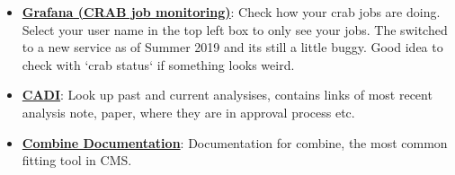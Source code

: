 \begin{itemize}
  \item \textbf{\href{https://monit-grafana.cern.ch/d/cmsTMGlobal/cms-tasks-monitoring-globalview?orgId=11}{Grafana (CRAB job monitoring)}}:
    Check how your crab jobs are doing. Select your user name in the top left box to only see your jobs. The switched to a new service as of Summer 2019 and its still a little buggy.
    Good idea to check with `crab status` if something looks weird. 

  \item \textbf{\href{http://cms.cern.ch/iCMS/analysisadmin/cadilines?awg=any&awgyear=2019}{CADI}}:
    Look up past and current analysises, contains links of most recent analysis note, paper, where they are in approval process etc. 

  \item \textbf{\href{https://github.com/cms-analysis/HiggsAnalysis-CombinedLimit/wiki}{Combine Documentation}}:
    Documentation for combine, the most common fitting tool in CMS. 





\end{itemize}



